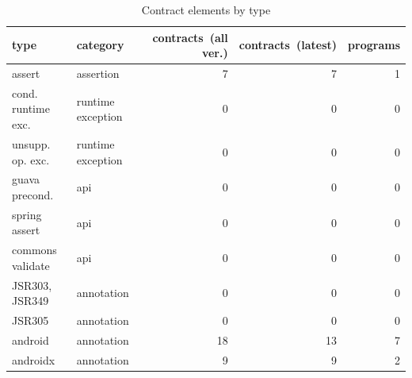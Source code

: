 \begin{table}[]
\centering
\caption{Contract elements by type}
\label{tab:contractsbytype}
\begin{tabular}{|p{5cm}|p{3cm}|r|r|r|} \hline
   type & category & \parbox{1.2cm}{contracts\ (all ver.)}  & \parbox{1.2cm}{contracts\ (latest)} & pro\-grams \\ \hline
	assert &  assertion &  7 &  7 &  1 \\ 
	cond. runtime exc. &  runtime exception &  0 &  0 &  0 \\ 
	unsupp. op. exc. &  runtime exception &  0 &  0 &  0 \\ 
	guava precond. &  api &  0 &  0 &  0 \\ 
	spring assert &  api &  0 &  0 &  0 \\ 
	commons validate &  api &  0 &  0 &  0 \\ 
	JSR303, JSR349 &  annotation &  0 &  0 &  0 \\ 
	JSR305 &  annotation &  0 &  0 &  0 \\ 
	android &  annotation &  18 &  13 &  7 \\ 
	androidx &  annotation &  9 &  9 &  2 \\ 
\hline
\end{tabular}
\end{table}

